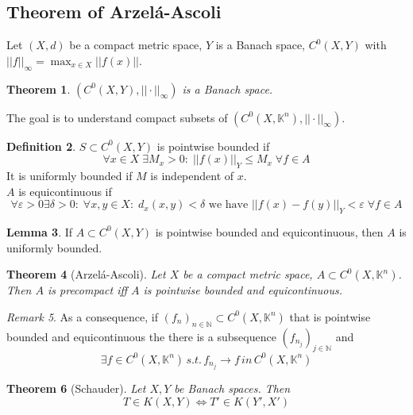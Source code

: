 \documentclass[a4paper, 12pt]{article}
\theoremstyle{plain}
\newtheorem{theorem}{Theorem}[subsection] %
\theoremstyle{definition}
\newtheorem{definition}[theorem]{Definition} %
\theoremstyle{lemma}
\newtheorem{lemma}[theorem]{Lemma}
\theoremstyle{remark}
\newtheorem{remark}[theorem]{Remark}
\theoremstyle{corollary}
\theoremstyle{example}
\begin{document}
	\subsection{Theorem of Arzelá-Ascoli}
	Let $(X,d)$ be a compact metric space, $Y$ is a Banach space, $C^0(X,Y)$ with $||f||_\infty = \max_{x\in X} ||f(x)||$.
	\begin{theorem}
		$(C^0(X,Y),||\cdot ||_\infty)$ is a Banach space.
	\end{theorem}
	The goal is to understand compact subsets of $(C^0(X,\mathbb{K}^n),||\cdot ||_\infty)$. 
	\begin{definition}
		$S\subset C^0(X,Y)$ is pointwise bounded if \[\forall x \in X \; \exists M_x > 0: \; ||f(x)||_Y \leq M_x \; \forall f \in A\]
		It is uniformly bounded if $M$ is independent of $x$.\\
		$A$ is equicontinuous if \[\forall \varepsilon > 0 \exists \delta > 0: \; \forall x,y \in X: \; d_x(x,y) < \delta \text{ we have } ||f(x)-f(y)||_Y < \varepsilon \; \forall f \in A\]
	\end{definition}
	\begin{lemma}
		If $A \subset C^0(X,Y)$ is pointwise bounded and equicontinuous, then $A$ is uniformly bounded.
	\end{lemma}
	\begin{theorem}[Arzelá-Ascoli]
		Let $X$ be a compact metric space, $A\subset C^0(X,\mathbb{K}^n)$. Then $A$ is precompact iff $A$ is pointwise bounded and equicontinuous.
	\end{theorem}
	\begin{remark}
		As a consequence, if $(f_n)_{n \in \mathbb{N}} \subset C^0(X,\mathbb{K}^n)$ that is pointwise bounded and equicontinuous the there is a subsequence $(f_{n_j})_{j \in \mathbb{N}}$ and \[\exists f \in C^0(X,\mathbb{K}^n) \, s.t. \, f_{n_j} \to f \, in\, C^0(X,\mathbb{K}^n)\]
	\end{remark}
	\begin{theorem}[Schauder]
		Let $X,Y$ be Banach spaces. Then \[T \in K(X,Y) \iff T' \in K(Y',X')\]
	\end{theorem}
\end{document}
